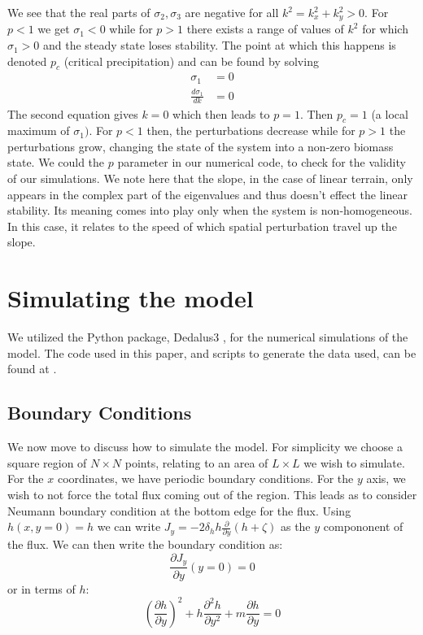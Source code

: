 \documentclass{article}
\numberwithin{equation}{section}
\begin{document}
We see that the real parts of $\sigma_2,\sigma_3$ are negative for all $k^2 = k_x^2+k_y^2>0$. For $p<1$ we get $\sigma_1<0$  while for $p>1$  there exists a range of values of $k^2$  for which $\sigma_1>0$ and the steady state loses stability. The point at which this happens is denoted $p_c$ (critical precipitation) and can be found by solving
\begin{align}
    \sigma_1             & = 0  \\
    \frac{d\sigma_1}{dk} & =  0
\end{align}
The second equation gives $k=0$ which then leads to $p=1$. Then $p_c=1$ (a local maximum of $\sigma_1)$. For $p<1$ then, the perturbations decrease while for $p>1$ the perturbations grow, changing the state of the system into a non-zero biomass state. We could the $p$ parameter in our numerical code, to check for the validity of our simulations.
We note here that the slope, in the case of linear terrain, only appears in the complex part of the eigenvalues and thus doesn't effect the linear stability. Its meaning comes into play only when the system is non-homogeneous. In this case, it relates to the speed of which spatial perturbation travel up the slope.
\section{Simulating the model}

We utilized the Python package, Dedalus3 \parencite[]{dedalus2020}, for the numerical simulations of the model. The code used in this paper, and scripts to generate the data used, can be found at \cite{Ohad_Relation_Between_Biomass_2023}.

\subsection{Boundary Conditions}
We now move to discuss how to simulate the model. For simplicity we choose a square region of $N\times N$ points, relating to an area of  $L\times L$  we wish to simulate. For the $x$ coordinates, we have periodic boundary conditions. For the $y$ axis, we wish to not force the total flux coming out of the region. This leads as to consider Neumann boundary condition at the bottom edge for the flux. Using $h(x,y=0)=h$ we can write $J_y=-2\delta_h h \frac{\partial}{\partial y}(h+\zeta)$ as the $y$ compononent of the flux. We can then write the boundary condition as:
\begin{equation}
    \frac{\partial J_y}{\partial y}(y=0) = 0
\end{equation}
or in terms of $h$:
\begin{equation}
    \left(\frac{\partial h}{\partial y}\right)^2 + h \frac{\partial^2 h}{\partial y^2} + m \frac{\partial h}{\partial y} = 0
\end{equation}
\end{document}
